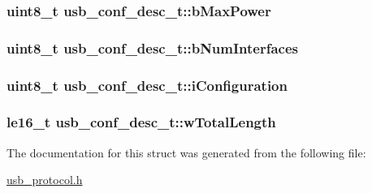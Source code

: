 \label{structusb__conf__desc__t_a46f189582cb2ccdd46ded73ebd518d74}
\hypertarget{structusb__conf__desc__t_aa514d0a8b697cc3035bbaea8553638ec}{
\subsubsection[{b\-Max\-Power}]{\setlength{\rightskip}{0pt plus 5cm}uint8\-\_\-t {\bf usb\-\_\-conf\-\_\-desc\-\_\-t\-::b\-Max\-Power}}}
\label{structusb__conf__desc__t_aa514d0a8b697cc3035bbaea8553638ec}
\hypertarget{structusb__conf__desc__t_a445aa9404b196af184c74d3f8dfe691f}{
\subsubsection[{b\-Num\-Interfaces}]{\setlength{\rightskip}{0pt plus 5cm}uint8\-\_\-t {\bf usb\-\_\-conf\-\_\-desc\-\_\-t\-::b\-Num\-Interfaces}}}
\label{structusb__conf__desc__t_a445aa9404b196af184c74d3f8dfe691f}
\hypertarget{structusb__conf__desc__t_a87ae189b300bdce2b61e690797218e79}{
\subsubsection[{i\-Configuration}]{\setlength{\rightskip}{0pt plus 5cm}uint8\-\_\-t {\bf usb\-\_\-conf\-\_\-desc\-\_\-t\-::i\-Configuration}}}
\label{structusb__conf__desc__t_a87ae189b300bdce2b61e690797218e79}
\hypertarget{structusb__conf__desc__t_afa2ba7e6e481d99b0dd4c40744efc5bb}{
\subsubsection[{w\-Total\-Length}]{\setlength{\rightskip}{0pt plus 5cm}le16\-\_\-t {\bf usb\-\_\-conf\-\_\-desc\-\_\-t\-::w\-Total\-Length}}}
\label{structusb__conf__desc__t_afa2ba7e6e481d99b0dd4c40744efc5bb}


\-The documentation for this struct was generated from the following file\-:\begin{DoxyCompactItemize}
\item 
\hyperlink{usb__protocol_8h}{usb\-\_\-protocol.\-h}\end{DoxyCompactItemize}
